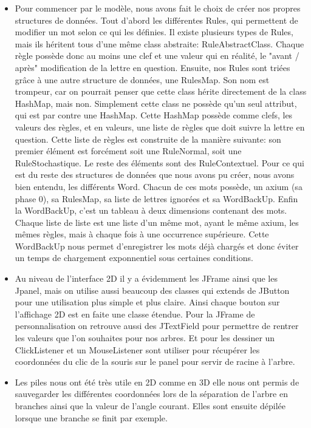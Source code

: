 \documentclass[a4paper,12pt]{article}
\begin{document}
\begin{itemize}[label=\textbullet, font=\small]
    \item Pour commencer par le modèle, nous avons fait le choix de créer nos propres structures de données. Tout d'abord les différentes Rules, qui permettent de modifier un mot selon ce qui les définies. Il existe plusieurs types de Rules, mais ils héritent tous d'une même class abstraite: RuleAbstractClass. Chaque règle possède donc au moins une clef et une valeur qui en réalité, le "avant / après" modification de la lettre en question. Ensuite, nos Rules sont triées grâce à une autre structure de données, une RulesMap. Son nom est trompeur, car on pourrait penser que cette class hérite directement de la class HashMap, mais non. Simplement cette class ne possède qu'un seul attribut, qui est par contre une HashMap. Cette HashMap possède comme clefs, les valeurs des règles, et en valeurs, une liste de règles que doit suivre la lettre en question. Cette liste de règles est construite de la manière suivante: son premier élément est forcément soit une RuleNormal, soit une RuleStochastique. Le reste des éléments sont des RuleContextuel. Pour ce qui est du reste des structures de données que nous avons pu créer, nous avons bien entendu, les différents Word. Chacun de ces mots possède, un axium (sa phase 0), sa RulesMap, sa liste de lettres ignorées et sa WordBackUp. Enfin la WordBackUp, c'est un tableau à deux dimensions contenant des mots. Chaque liste de liste est une liste d'un même mot, ayant le même axium, les mêmes règles, mais à chaque fois à une occurrence supérieure. Cette WordBackUp nous permet d'enregistrer les mots déjà chargés et donc éviter un temps de chargement exponnentiel sous certaines conditions.
\\
    \item Au niveau de l'interface 2D il y a évidemment les JFrame ainsi que les Jpanel, mais on utilise aussi beaucoup des classes qui extends de JButton pour une utilisation plus simple et plus claire. Ainsi chaque bouton sur l'affichage 2D est en faite une classe étendue. Pour la JFrame de personnalisation on retrouve aussi des JTextField pour permettre de rentrer les valeurs que l'on souhaites pour nos arbres. Et pour les dessiner un ClickListener et un MouseListener sont utiliser pour récupérer les coordonnées du clic de la souris sur le panel pour servir de racine à l'arbre.
\\
    \item Les piles nous ont été très utile en 2D comme en 3D elle nous ont permis de sauvegarder les différentes coordonnées lors de la séparation de l'arbre en branches ainsi que la valeur de l'angle courant. Elles sont ensuite dépilée lorsque une branche se finit par exemple. 

\end{itemize}
\end{document}
